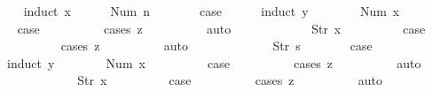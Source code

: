 \begin{isabellebody}
\ \ \isamarkupfalse%
\ {\isacharparenleft}induct\ x{\isacharparenright}\isanewline
\ \ \ \ \isamarkupfalse%
\ {\isacharparenleft}Num\ n{\isacharparenright}\isanewline
\ \ \ \ \isamarkupfalse%
\ \isamarkupfalse%
\ {\isacharquery}case\isanewline
\ \ \ \ \isamarkupfalse%
\ {\isacharparenleft}induct\ y{\isacharparenright}\isanewline
\ \ \ \ \ \ \isamarkupfalse%
\ {\isacharparenleft}Num\ x{\isacharparenright}\isanewline
\ \ \ \ \ \ \isamarkupfalse%
\ \isamarkupfalse%
\ {\isacharquery}case\isanewline
\ \ \ \ \ \ \ \ \isamarkupfalse%
\ {\isacharparenleft}cases\ z{\isacharparenright}\isanewline
\ \ \ \ \ \ \ \ \isamarkupfalse%
\ auto\isanewline
\ \ \ \ \isamarkupfalse%
\isanewline
\ \ \ \ \ \ \isamarkupfalse%
\ {\isacharparenleft}Str\ x{\isacharparenright}\isanewline
\ \ \ \ \ \ \isamarkupfalse%
\ \isamarkupfalse%
\ {\isacharquery}case\isanewline
\ \ \ \ \ \ \ \ \isamarkupfalse%
\ {\isacharparenleft}cases\ z{\isacharparenright}\isanewline
\ \ \ \ \ \ \ \ \isamarkupfalse%
\ auto\isanewline
\ \ \ \ \isamarkupfalse%
\isanewline
\ \ \isamarkupfalse%
\isanewline
\ \ \ \ \isamarkupfalse%
\ {\isacharparenleft}Str\ s{\isacharparenright}\isanewline
\ \ \ \ \isamarkupfalse%
\ \isamarkupfalse%
\ {\isacharquery}case\isanewline
\ \ \ \ \isamarkupfalse%
\ {\isacharparenleft}induct\ y{\isacharparenright}\isanewline
\ \ \ \ \ \ \isamarkupfalse%
\ {\isacharparenleft}Num\ x{\isacharparenright}\isanewline
\ \ \ \ \ \ \isamarkupfalse%
\ \isamarkupfalse%
\ {\isacharquery}case\isanewline
\ \ \ \ \ \ \ \ \isamarkupfalse%
\ {\isacharparenleft}cases\ z{\isacharparenright}\isanewline
\ \ \ \ \ \ \ \ \isamarkupfalse%
\ auto\isanewline
\ \ \ \ \isamarkupfalse%
\isanewline
\ \ \ \ \ \ \isamarkupfalse%
\ {\isacharparenleft}Str\ x{\isacharparenright}\isanewline
\ \ \ \ \ \ \isamarkupfalse%
\ \isamarkupfalse%
\ {\isacharquery}case\isanewline
\ \ \ \ \ \ \ \ \isamarkupfalse%
\ {\isacharparenleft}cases\ z{\isacharparenright}\isanewline
\ \ \ \ \ \ \ \ \isamarkupfalse%
\ auto\isanewline
\ \ \ \ \isamarkupfalse%
\isanewline
\ \ \isamarkupfalse%

\end{isabellebody}
